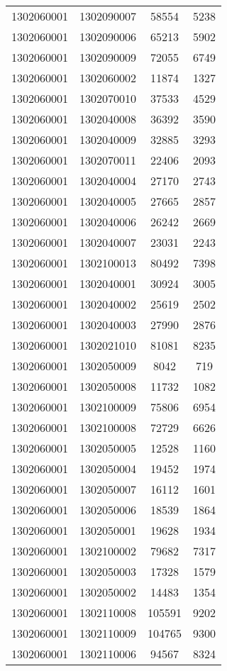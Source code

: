 \begin{longtable}[h]{llcc}
		1302060001 & 1302090007 & 58554 & 5238\\
		1302060001 & 1302090006 & 65213 & 5902\\
		1302060001 & 1302090009 & 72055 & 6749\\
		1302060001 & 1302060002 & 11874 & 1327\\
		1302060001 & 1302070010 & 37533 & 4529\\
		1302060001 & 1302040008 & 36392 & 3590\\
		1302060001 & 1302040009 & 32885 & 3293\\
		1302060001 & 1302070011 & 22406 & 2093\\
		1302060001 & 1302040004 & 27170 & 2743\\
		1302060001 & 1302040005 & 27665 & 2857\\
		1302060001 & 1302040006 & 26242 & 2669\\
		1302060001 & 1302040007 & 23031 & 2243\\
		1302060001 & 1302100013 & 80492 & 7398\\
		1302060001 & 1302040001 & 30924 & 3005\\
		1302060001 & 1302040002 & 25619 & 2502\\
		1302060001 & 1302040003 & 27990 & 2876\\
		1302060001 & 1302021010 & 81081 & 8235\\
		1302060001 & 1302050009 & 8042 & 719\\
		1302060001 & 1302050008 & 11732 & 1082\\
		1302060001 & 1302100009 & 75806 & 6954\\
		1302060001 & 1302100008 & 72729 & 6626\\
		1302060001 & 1302050005 & 12528 & 1160\\
		1302060001 & 1302050004 & 19452 & 1974\\
		1302060001 & 1302050007 & 16112 & 1601\\
		1302060001 & 1302050006 & 18539 & 1864\\
		1302060001 & 1302050001 & 19628 & 1934\\
		1302060001 & 1302100002 & 79682 & 7317\\
		1302060001 & 1302050003 & 17328 & 1579\\
		1302060001 & 1302050002 & 14483 & 1354\\
		1302060001 & 1302110008 & 105591 & 9202\\
		1302060001 & 1302110009 & 104765 & 9300\\
		1302060001 & 1302110006 & 94567 & 8324\\

\end{longtable}
